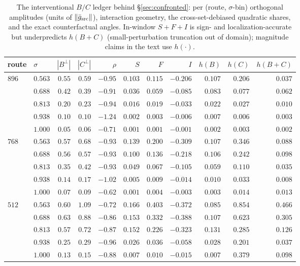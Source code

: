 \begin{table}[t]
\caption{The interventional $B/C$ ledger behind
\S\ref{sec:confronted}: per (route, $\sigma$-bin) orthogonal
amplitudes (units of $\|\bar g_{\mathrm{src}}\|$), interaction geometry, the
cross-set-debiased quadratic shares, and the exact counterfactual
angles. In-window $S{+}F{+}I$ is sign- and localization-accurate but
underpredicts $h(B{+}C)$ (small-perturbation truncation out of
domain); magnitude claims in the text use $h(\cdot)$.}
\label{tab:e9ledger}
\begin{center}
\small
\begin{tabular}{llrrrrrrrrr}
\toprule
route & $\sigma$ & $|B^{\perp}|$ & $|C^{\perp}|$ & $\rho$ & $S$ & $F$ & $I$ & $h(B)$ & $h(C)$ & $h(B{+}C)$ \\
\midrule
$896$ & $0.563$ & $0.55$ & $0.59$ & $-0.95$ & $0.103$ & $0.115$ & $-0.206$ & $0.107$ & $0.206$ & $0.037$ \\
      & $0.688$ & $0.42$ & $0.39$ & $-0.91$ & $0.036$ & $0.059$ & $-0.085$ & $0.083$ & $0.077$ & $0.062$ \\
      & $0.813$ & $0.20$ & $0.23$ & $-0.94$ & $0.016$ & $0.019$ & $-0.033$ & $0.022$ & $0.027$ & $0.010$ \\
      & $0.938$ & $0.10$ & $0.10$ & $-1.24$ & $0.002$ & $0.003$ & $-0.006$ & $0.007$ & $0.006$ & $0.003$ \\
      & $1.000$ & $0.05$ & $0.06$ & $-0.71$ & $0.001$ & $0.001$ & $-0.001$ & $0.002$ & $0.003$ & $0.002$ \\
\midrule
$768$ & $0.563$ & $0.57$ & $0.68$ & $-0.93$ & $0.139$ & $0.200$ & $-0.309$ & $0.107$ & $0.346$ & $0.088$ \\
      & $0.688$ & $0.56$ & $0.57$ & $-0.93$ & $0.100$ & $0.136$ & $-0.218$ & $0.106$ & $0.242$ & $0.098$ \\
      & $0.813$ & $0.35$ & $0.42$ & $-0.93$ & $0.049$ & $0.067$ & $-0.105$ & $0.059$ & $0.110$ & $0.035$ \\
      & $0.938$ & $0.14$ & $0.17$ & $-1.02$ & $0.005$ & $0.009$ & $-0.014$ & $0.010$ & $0.033$ & $0.008$ \\
      & $1.000$ & $0.07$ & $0.09$ & $-0.62$ & $0.001$ & $0.004$ & $-0.003$ & $0.003$ & $0.014$ & $0.013$ \\
\midrule
$512$ & $0.563$ & $0.60$ & $1.09$ & $-0.72$ & $0.166$ & $0.403$ & $-0.372$ & $0.085$ & $0.854$ & $0.466$ \\
      & $0.688$ & $0.63$ & $0.88$ & $-0.86$ & $0.153$ & $0.332$ & $-0.388$ & $0.107$ & $0.623$ & $0.305$ \\
      & $0.813$ & $0.57$ & $0.72$ & $-0.87$ & $0.152$ & $0.226$ & $-0.323$ & $0.131$ & $0.285$ & $0.126$ \\
      & $0.938$ & $0.25$ & $0.29$ & $-0.96$ & $0.026$ & $0.036$ & $-0.058$ & $0.028$ & $0.201$ & $0.037$ \\
      & $1.000$ & $0.13$ & $0.15$ & $-0.88$ & $0.007$ & $0.010$ & $-0.015$ & $0.007$ & $0.379$ & $0.098$ \\
\bottomrule
\end{tabular}
\end{center}
\end{table}

